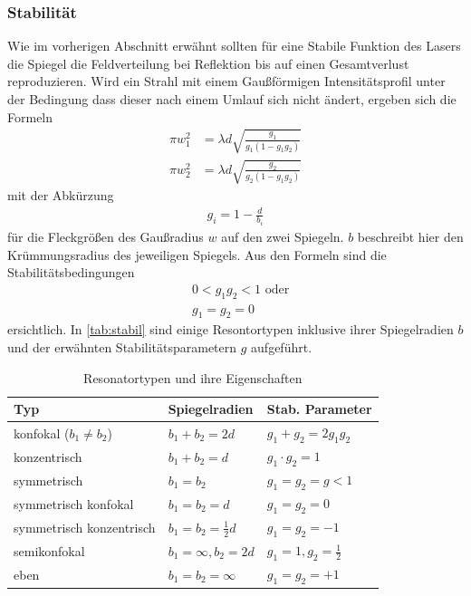\subsubsection{Stabilität}
Wie im vorherigen Abschnitt erwähnt sollten für eine Stabile Funktion des Lasers die Spiegel die Feldverteilung bei Reflektion bis auf einen Gesamtverlust reproduzieren. Wird ein Strahl mit einem Gaußförmigen Intensitätsprofil unter der Bedingung dass dieser nach einem Umlauf sich nicht ändert, ergeben sich die Formeln
\begin{align*}
    \pi w_1^2 &=\lambda d \sqrt{\frac{g_1}{g_1(1-g_1g_2)}}\\
    \pi w_2^2 &=\lambda d \sqrt{\frac{g_2}{g_2(1-g_1g_2)}}
\end{align*} 
mit der Abkürzung 
\begin{align}
    g_i=1-\frac{d}{b_i}
\end{align} 
für die Fleckgrößen des Gaußradius $w$ auf den zwei Spiegeln. $b$ beschreibt hier den Krümmungsradius des jeweiligen Spiegels.
Aus den Formeln sind die Stabilitätsbedingungen
\begin{align}
    &0<g_1g_2<1\text{ oder}\\
    &g_1=g_2=0
\end{align}
ersichtlich. In \autoref{tab:stabil} sind einige Resontortypen inklusive ihrer Spiegelradien $b$ und der erwähnten Stabilitätsparametern $g$ aufgeführt.
\begin{table}[H]
  \centering
  \caption{Resonatortypen und ihre Eigenschaften}
  \begin{tabular}{l | l | l}
    \toprule
    Typ & Spiegelradien & Stab. Parameter \\
    \midrule
    konfokal ($b_1 \neq b_2$)            & $b_1 + b_2 = 2d$             & $g_1 + g_2 = 2g_1g_2$ \\
    konzentrisch                         & $b_1 + b_2 = d$              & $g_1 \cdot g_2 = 1$ \\
    symmetrisch                          & $b_1 = b_2$                  & $g_1 = g_2 = g < 1$ \\
    symmetrisch konfokal                 & $b_1 = b_2 = d$              & $g_1 = g_2 = 0$ \\
    symmetrisch konzentrisch             & $b_1 = b_2 = \frac{1}{2}d$   & $g_1 = g_2 = -1$ \\
    semikonfokal                         & $b_1 = \infty, b_2 = 2d$     & $g_1 = 1, g_2 = \frac{1}{2}$ \\
    eben                                 & $b_1 = b_2 = \infty$         & $g_1 = g_2 = +1$ \\
    \bottomrule
  \end{tabular}
  \label{tab:stabil}
\end{table}
